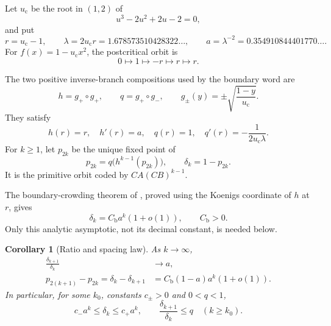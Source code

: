 \documentclass[11pt]{article}
\newtheorem{corollary}[theorem]{Corollary}
\theoremstyle{definition}
\theoremstyle{remark}
\newcommand{\uc}{u_{\mathrm c}}
\begin{document}
Let $\uc$ be the root in $(1,2)$ of
\begin{equation}\label{eq:cubic}
 u^3-2u^2+2u-2=0,
\end{equation}
and put
\begin{equation}\label{eq:constants}
 r=\uc-1,
 \qquad
 \lambda=2\uc r=1.678573510428322\ldots,
 \qquad
 a=\lambda^{-2}=0.354910844401770\ldots.
\end{equation}
For $f(x)=1-\uc x^2$, the postcritical orbit is
\begin{equation}\label{eq:critical-orbit}
 0\longmapsto1\longmapsto-r\longmapsto r\longmapsto r.
\end{equation}

The two positive inverse-branch compositions used by the boundary word are
\begin{equation}\label{eq:h-q}
 h=g_+\circ g_+,
 \qquad
 q=g_+\circ g_-,
 \qquad
 g_\pm(y)=\pm\sqrt{\frac{1-y}{\uc}}.
\end{equation}
They satisfy
\begin{equation}\label{eq:h-q-data}
 h(r)=r,
 \quad h'(r)=a,
 \quad q(r)=1,
 \quad q'(r)=-\frac1{2\uc\lambda}.
\end{equation}
For $k\ge1$, let $p_{2k}$ be the unique fixed point of
\begin{equation}\label{eq:boundary-fixed-point}
 p_{2k}=q\bigl(h^{k-1}(p_{2k})\bigr),
 \qquad
 \delta_k=1-p_{2k}.
\end{equation}
It is the primitive orbit coded by $CA(CB)^{k-1}$.

The boundary-crowding theorem of \citet{WangLongCycle2026}, proved using the
Koenigs coordinate of $h$ at $r$, gives
\begin{equation}\label{eq:boundary-asymptotic}
 \delta_k=C_{\mathrm b}a^k(1+o(1)),
 \qquad C_{\mathrm b}>0.
\end{equation}
Only this analytic asymptotic, not its decimal constant, is needed below.

\begin{corollary}[Ratio and spacing law]
\label{cor:ratio-spacing}
As $k\to\infty$,
\begin{align}
 \frac{\delta_{k+1}}{\delta_k}&\longrightarrow a,
 \label{eq:ratio-law}\\
 p_{2(k+1)}-p_{2k}
 =\delta_k-\delta_{k+1}
 &=C_{\mathrm b}(1-a)a^k(1+o(1)).
 \label{eq:spacing-law}
\end{align}
In particular, for some $k_0$, constants $c_\pm>0$ and $0<q<1$,
\begin{equation}\label{eq:geometric-bounds}
 c_-a^k\le\delta_k\le c_+a^k,
 \qquad
 \frac{\delta_{k+1}}{\delta_k}\le q
 \quad(k\ge k_0).
\end{equation}
\end{corollary}
\end{document}
